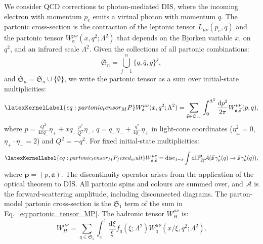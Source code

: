 \documentclass[%
 reprint,
 amsmath,amssymb,
 superscriptaddress,
 aps,
 preprintnumbers,
prl,
floatfix,
]{revtex4-2}
\let\label\latexKernelLabel
\begin{document}
We consider QCD corrections to photon-mediated DIS, where the incoming electron with momentum $p_e$ emits a virtual photon with momentum $q$.
The partonic cross-section is the contraction of the leptonic tensor $L_{\mu\nu}(p_e,q)$ and the partonic tensor $W_{\mathfrak{a}}^{\mu\nu}(x,q^2;\Lambda^2)$ that depends on the Bjorken variable $x$, on $q^2$, and an infrared scale $\Lambda^2$.
Given the collections of all partonic combinations:
\begin{equation}
 \mathfrak{S}_n=\bigcup_{j=1}^n \{q,\bar{q},g\}^j,
\end{equation}
and $\tilde{\mathfrak{S}}_n=\mathfrak{S}_n\cup \{\emptyset\}$, we write the partonic tensor as a sum over initial-state multiplicities:
\begin{equation}
\label{eq:partonic_tensor_MP}
W_{\mathfrak{a}}^{\mu\nu}(x,q^2;\Lambda^2)= \sum_{\vec{\mathfrak{s}}\in \mathfrak{S}_\infty}\int_0^{\Lambda^2} \frac{\mathrm{d}p^2}{2\pi}W_{\mathfrak{a},\vec{\mathfrak{s}}}^{\mu\nu}(p,q),
\end{equation}
where $p=\frac{Q^2}{4xq_-}\eta_++xq_-\frac{p^2}{Q^2}\eta_-$, $q=q_-\eta_-+\frac{q^2}{4q_-}\eta_+$ in light-cone coordinates ($\eta_\pm^2=0$, $\eta_+\cdot \eta_-=2$) and $Q^2=-q^2$.
For fixed initial-state multiplicities:
\begin{equation}
\label{eq:partonic_tensor_MP_fixed_mult}
W_{\mathfrak{a},\vec{\mathfrak{s}}}^{\mu\nu}=\text{disc}_{1-x}\int \mathrm{d}\Pi_{|\vec{\mathfrak{s}}|}^\mathbf{p}\mathcal{A}(\vec{\mathfrak{s}} \, \gamma^\star_\mu(q)\rightarrow \vec{\mathfrak{s}} \, \gamma^\star_\nu(q)),
\end{equation}
where $\mathbf{p}=(p,\mathfrak{a})$. The discontinuity operator arises from the application of the optical theorem to DIS.
All partonic spins and colours are summed over, and $\mathcal{A}$ is the forward-scattering amplitude, including disconnected diagrams.
The parton-model partonic cross-section is the $\mathfrak{S}_1$ term of the sum in Eq.~\eqref{eq:partonic_tensor_MP}.
The hadronic tensor $W_{H}^{\mu\nu}$ is:
\begin{equation}
W_{H}^{\mu\nu}=\sum_{\mathfrak{q}\in\mathfrak{S}_1}\int_x^1 \frac{\mathrm{d}\xi}{\xi} f_{\mathfrak{q}}(\xi;\Lambda^2)W_{\mathfrak{q}}^{\mu\nu}(x/\xi,q^2;\Lambda^2).
\end{equation}
\end{document}
